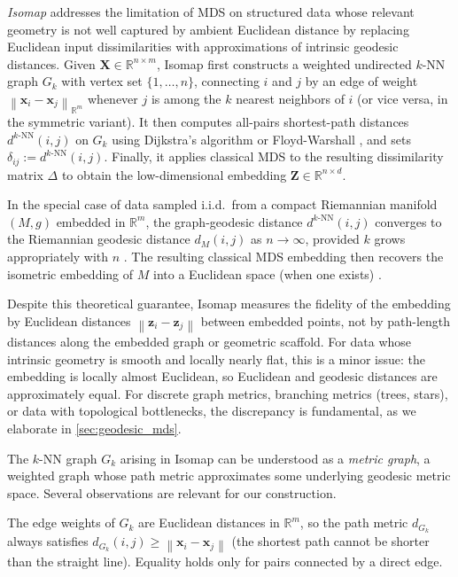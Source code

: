 \documentclass[11pt]{article}
\newcommand{\R}{\mathbb{R}}
\newcommand{\bx}{\mathbf{x}}
\newcommand{\bX}{\mathbf{X}}
\newcommand{\bz}{\mathbf{z}}
\newcommand{\bZ}{\mathbf{Z}}
\newcommand{\norm}[1]{\left\|#1\right\|}
\newcommand{\dknn}{d^{k\text{-NN}}}
\newcommand{\Gk}{G_k}
\begin{document}
\emph{Isomap} \citep{tenenbaum2000global} addresses the limitation of MDS
on structured data whose relevant geometry is not well captured by ambient Euclidean distance by replacing Euclidean input
dissimilarities with approximations of intrinsic geodesic distances.
Given $\bX \in \R^{n \times m}$, Isomap first constructs a weighted
undirected $k$-NN graph $\Gk$ with vertex set $\{1, \ldots, n\}$,
connecting $i$ and $j$ by an edge of weight $\norm{\bx_i - \bx_j}_{\R^m}$
whenever $j$ is among the $k$ nearest neighbors of $i$ (or vice versa, in
the symmetric variant).  It then computes all-pairs shortest-path
distances $\dknn(i,j)$ on $\Gk$ using Dijkstra's algorithm
\citep{dijkstra1959note} or Floyd-Warshall \citep{floyd1962algorithm},
and sets $\delta_{ij} := \dknn(i,j)$.  Finally, it applies classical MDS
to the resulting dissimilarity matrix $\Delta$ to obtain the
low-dimensional embedding $\bZ \in \R^{n \times d}$.

In the special case of data sampled i.i.d.\ from a compact Riemannian manifold $(M, g)$
embedded in $\R^m$, the graph-geodesic distance $\dknn(i,j)$ converges
to the Riemannian geodesic distance $d_M(i,j)$ as $n \to \infty$, provided
$k$ grows appropriately with $n$ \citep{bernstein2000graph,
tenenbaum2000global, zha2003continuum, donoho2003hessian}.
The resulting classical MDS embedding then recovers the isometric embedding
of $M$ into a Euclidean space (when one exists) \citep{tenenbaum2000global}.

Despite this theoretical guarantee, Isomap measures the fidelity of the
embedding by Euclidean distances $\norm{\bz_i - \bz_j}$ between embedded
points, not by path-length distances along the embedded graph or geometric
scaffold.  For data whose intrinsic geometry is smooth and locally nearly
flat, this is a minor issue: the embedding is locally almost Euclidean, so
Euclidean and geodesic distances
are approximately equal.  For discrete graph metrics, branching metrics
(trees, stars), or data with topological bottlenecks, the discrepancy is
fundamental, as we elaborate in \cref{sec:geodesic_mds}.

The $k$-NN graph $\Gk$ arising in Isomap can be understood
as a \emph{metric graph}, a weighted graph whose path metric approximates
some underlying geodesic metric space.  Several observations are relevant
for our construction.

The edge weights of $\Gk$ are Euclidean distances in $\R^m$, so the path
metric $d_{\Gk}$ always satisfies $d_{\Gk}(i,j) \geq \norm{\bx_i - \bx_j}$
(the shortest path cannot be shorter than the straight line).  Equality
holds only for pairs connected by a direct edge.
\end{document}
